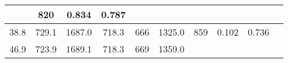 \documentclass[a4paper,10pt]{article}
\begin{document}
\begin{longtable}{
     |
%    
    c|
%    
    c|
%    
    c|
%    
    c|
%    
    c|
%    
    c|
%    
    c|
%    
    c|
%    
    c|
%    
    c|
%    
    }
%        
        & 820
%        

%        

%        
        & 0.834
%        

%        

%        
        & 0.787
%        

%        
        \\
        \hline

        

%        

%        
        38.8
%        

%        

%        
        & 729.1
%        

%        

%        
        & 1687.0
%        

%        

%        
        & 718.3
%        

%        

%        
        & 666
%        

%        

%        
        & 1325.0
%        

%        

%        
        & 859
%        

%        

%        
        & 0.102
%        

%        

%        
        & 0.736
%        

%        
        \\
        \hline

        

%        

%        
        46.9
%        

%        

%        
        & 723.9
%        

%        

%        
        & 1689.1
%        

%        

%        
        & 718.3
%        

%        

%        
        & 669
%        

%        

%        
        & 1359.0
%        

%        


\end{longtable}
\end{document}
